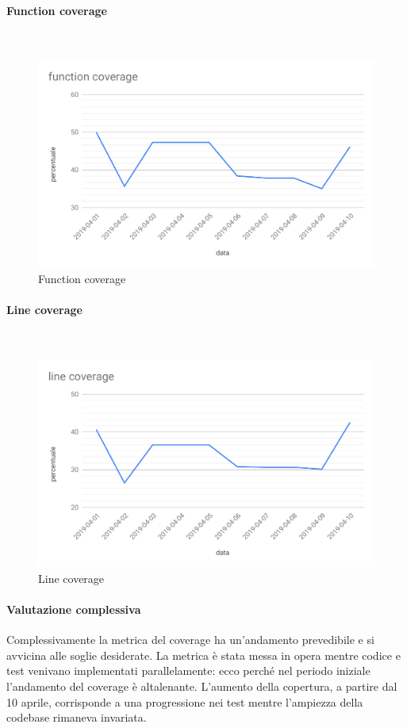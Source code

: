 \paragraph{Function coverage}\mbox{}\\
\begin{figure}[H]
	\centering
	\includegraphics[scale=0.6]{res/images/RA/function-coverage-RQ.pdf}
	\caption{Function coverage}
\end{figure}
\paragraph{Line coverage}\mbox{}\\
\begin{figure}[H]
	\centering
	\includegraphics[scale=0.6]{res/images/RA/line-coverage-RQ.pdf}
	\caption{Line coverage}
\end{figure}
\paragraph*{Valutazione complessiva}
Complessivamente la metrica del coverage ha un'andamento prevedibile e si avvicina alle soglie desiderate.
La metrica è stata messa in opera mentre codice e test venivano implementati parallelamente: ecco perché nel periodo iniziale l'andamento del coverage è altalenante.
L'aumento della copertura, a partire dal 10 aprile, corrisponde a una progressione nei test mentre l'ampiezza della codebase rimaneva invariata.

